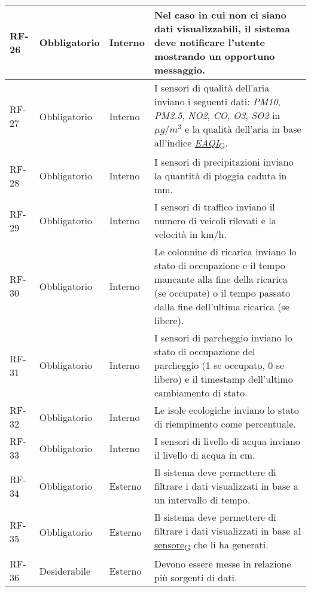 \begin{longtable}{|>{\centering\arraybackslash}m{}|>{\centering\arraybackslash}m{}|>{\centering\arraybackslash}m{}|>{\centering\arraybackslash}m{}|}
	\\\hline
	RF-26           & Obbligatorio        & Interno        & Nel caso in cui non ci siano dati visualizzabili, il sistema deve notificare l'utente mostrando un opportuno messaggio.
	\\\hline
	RF-27           & Obbligatorio        & Interno        & I sensori di qualità dell'aria inviano i seguenti dati: \textit{PM10}, \textit{PM2.5}, \textit{NO2}, \textit{CO}, \textit{O3}, \textit{SO2} in $\mu g/m^3$ e la qualità dell'aria in base all'indice \href{https://7last.github.io/docs/rtb/documentazione-interna/glossario\#european-air-quality-index}{\textit{EAQI}\textsubscript{G}}.                                       \\\hline
	RF-28           & Obbligatorio        & Interno        & I sensori di precipitazioni inviano la quantità di pioggia caduta in mm.
	\\\hline
	RF-29           & Obbligatorio        & Interno        & I sensori di traffico inviano il numero di veicoli rilevati e la velocità in km/h.
	\\\hline
	RF-30           & Obbligatorio        & Interno        & Le colonnine di ricarica inviano lo stato di occupazione e il tempo mancante alla fine della ricarica (se occupate) o il tempo passato dalla fine dell'ultima ricarica (se libere).
	\\\hline
	RF-31           & Obbligatorio        & Interno        & I sensori di parcheggio inviano lo stato di occupazione del parcheggio (1 se occupato, 0 se libero) e il timestamp dell'ultimo cambiamento di stato.
	\\\hline
	RF-32           & Obbligatorio        & Interno        & Le isole ecologiche inviano lo stato di riempimento come percentuale.
	\\\hline
	RF-33           & Obbligatorio        & Interno        & I sensori di livello di acqua inviano il livello di acqua in cm.
	\\\hline
	RF-34           & Obbligatorio        & Esterno        & Il sistema deve permettere di filtrare i dati visualizzati in base a un intervallo di tempo.
	\\\hline
	RF-35           & Obbligatorio        & Esterno        & Il sistema deve permettere di filtrare i dati visualizzati in base al \href{https://7last.github.io/docs/rtb/documentazione-interna/glossario\#sensore}{sensore\textsubscript{G}} che li ha generati.
	\\\hline
	RF-36           & Desiderabile        & Esterno        & Devono essere messe in relazione più sorgenti di dati.

\end{longtable}
